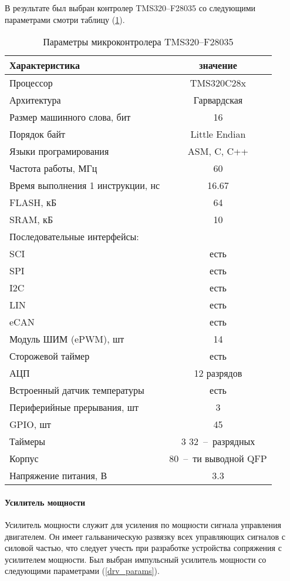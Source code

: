 В результате был выбран контролер TMS320--F28035 со следующими параметрами
смотри таблицу (\ref{mcu_params}).
\begin{table}[ht!]
    \centering
    \begin{tabular}{|l|c|}
        \hline
        Характеристика & значение \\
        \hline \hline
        Процессор & TMS320C28x \\
        Архитектура & Гарвардская \\
        Размер машинного слова, бит & 16 \\
        Порядок байт & Little Endian \\
        Языки програмирования & ASM, C, C++ \\
        Частота работы, МГц & 60 \\
        Время выполнения 1 инструкции, нс & 16.67 \\
        \hline
        FLASH, кБ & 64 \\
        SRAM,  кБ & 10 \\
        \hline
        Последовательные интерфейсы: & \\
        SCI  & есть \\
        SPI  & есть \\
        I2C  & есть \\
        LIN  & есть \\
        eCAN & есть \\
        \hline
        Модуль ШИМ (ePWM), шт & 14 \\
        \hline
        Сторожевой таймер & есть \\
        \hline
        АЦП & 12 разрядов \\
        \hline
        Встроенный датчик температуры & есть \\
        \hline
        Периферийные прерывания, шт & 3 \\
        \hline
        GPIO, шт  & 45 \\
        \hline
        Таймеры & 3 32~--~разрядных \\
        \hline
        Корпус & 80~--~ти выводной QFP \\
        \hline
        Напряжение питания, В & 3.3 \\
        \hline
    \end{tabular}
    \caption{Параметры микроконтролера TMS320--F28035}
    \label{mcu_params}
\end{table}


\paragraph{Усилитель мощности}
Усилитель мощности служит для усиления по мощности сигнала управления
двигателем. Он имеет гальваническую развязку всех управляющих сигналов с силовой
частью, что следует учесть при разработке устройства сопряжения с усилителем
мощности.
Был выбран импульсный усилитель мощности со следующими параметрами
(\ref{drv_params}).

